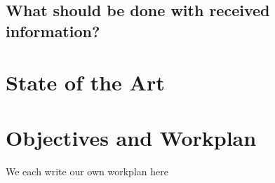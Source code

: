 \documentclass{article}
\begin{document}
%
%
%
%

\subsection{What should be done with received information?}


\section{State of the Art}
\section{Objectives and Workplan}
We each write our own workplan here



\end{document}
